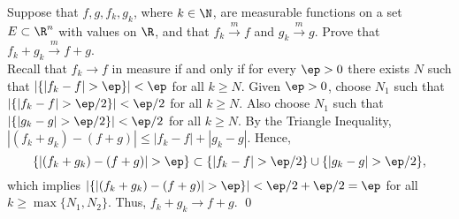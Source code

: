 \begin{hwsol}
Suppose that $f, g, f_k, g_k$, where $k \in \N$, are measurable functions on a set $E \subset \R^n$ with values on $\R$, and that $f_k \xrightarrow{m} f$ and $g_k \xrightarrow{m} g$. Prove that $f_k + g_k \xrightarrow{m} f+g$. \\

\pf Recall that $f_k \to f$ in measure if and only if for every $\ep > 0$ there exists $N$ such that $|\{ |f_k-f| > \ep \}| < \ep$ for all $k \geq N$. Given $\ep > 0$, choose $N_1$ such that $|\{ |f_k-f| > \ep/2 \}| < \ep/2$ for all $k \geq N$. Also choose $N_1$ such that $|\{ |g_k-g| > \ep/2 \}| < \ep/2$ for all $k \geq N$. By the Triangle Inequality, $|(f_k+g_k) - (f+g)| \leq |f_k-f| + |g_k-g|$. Hence, 
        \[
        \{ |(f_k+g_k) - (f+g)| > \ep \} \subset \{ |f_k-f| > \ep/2 \} \cup \{ |g_k-g| > \ep/2 \},
        \]
which implies $|\{ |(f_k+g_k) - (f+g)| > \ep \}| < \ep/2 + \ep/2= \ep$ for all $k \geq \max\{ N_1, N_2 \}$. Thus, $f_k+g_k \to f+g$. \qed \\
\end{hwsol}


